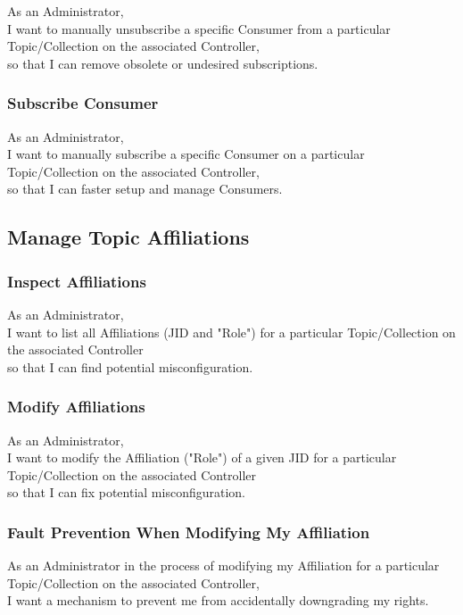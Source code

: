 As an Administrator, \\
I want to manually unsubscribe a specific Consumer from a particular Topic/Collection on the associated Controller, \\
so that I can remove obsolete or undesired subscriptions.

\subsubsection{Subscribe Consumer}

As an Administrator, \\
I want to manually subscribe a specific Consumer on a particular Topic/Collection on the associated Controller, \\
so that I can faster setup and manage Consumers.

\subsection{Manage Topic Affiliations}\label{sec:manage-affiliations}
\subsubsection{Inspect Affiliations}

As an Administrator,\\
I want to list all Affiliations (JID and "Role") for a particular Topic/Collection on the associated Controller \\
so that I can find potential misconfiguration.

\subsubsection{Modify Affiliations}

As an Administrator,\\
I want to modify the Affiliation ("Role") of a given JID for a particular Topic/Collection on the associated Controller \\
so that I can fix potential misconfiguration.

\subsubsection{Fault Prevention When Modifying My Affiliation}

As an Administrator in the process of modifying my Affiliation for a particular Topic/Collection on the associated Controller,\\
I want a mechanism to prevent me from accidentally downgrading my rights.

